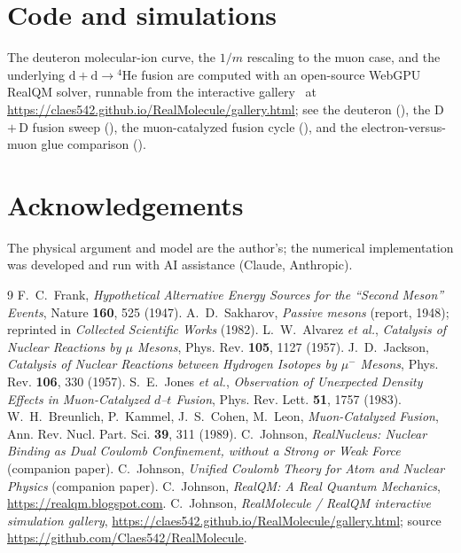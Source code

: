 \documentclass[11pt]{article}
\begin{document}
\section*{Code and simulations}
\sloppy
The deuteron molecular-ion curve, the $1/m$ rescaling to the muon case, and the underlying
$\mathrm{d}+\mathrm{d}\to{}^4\mathrm{He}$ fusion are computed with an open-source WebGPU RealQM solver,
runnable from the interactive gallery~\cite{Gallery} at
\url{https://claes542.github.io/RealMolecule/gallery.html}; see the deuteron (),
the D\,$+$\,D fusion sweep (), the muon-catalyzed fusion cycle
(), and the electron-versus-muon glue comparison
().
\fussy

\section*{Acknowledgements}
The physical argument and model are the author's; the numerical implementation was developed and run
with AI assistance (Claude, Anthropic).

\begin{thebibliography}{9}
 F.~C.~Frank, \emph{Hypothetical Alternative Energy Sources for the ``Second Meson''
Events}, Nature \textbf{160}, 525 (1947).
 A.~D.~Sakharov, \emph{Passive mesons} (report, 1948); reprinted in \emph{Collected
Scientific Works} (1982).
 L.~W.~Alvarez \emph{et al.}, \emph{Catalysis of Nuclear Reactions by $\mu$ Mesons},
Phys. Rev. \textbf{105}, 1127 (1957).
 J.~D.~Jackson, \emph{Catalysis of Nuclear Reactions between Hydrogen Isotopes by
$\mu^-$ Mesons}, Phys. Rev. \textbf{106}, 330 (1957).
 S.~E.~Jones \emph{et al.}, \emph{Observation of Unexpected Density Effects in
Muon-Catalyzed $d$--$t$ Fusion}, Phys. Rev. Lett. \textbf{51}, 1757 (1983).
 W.~H.~Breunlich, P.~Kammel, J.~S.~Cohen, M.~Leon, \emph{Muon-Catalyzed Fusion},
Ann. Rev. Nucl. Part. Sci. \textbf{39}, 311 (1989).
 C.~Johnson, \emph{RealNucleus: Nuclear Binding as Dual Coulomb
Confinement, without a Strong or Weak Force} (companion paper).
 C.~Johnson, \emph{Unified Coulomb Theory for Atom and Nuclear Physics}
(companion paper).
 C.~Johnson, \emph{RealQM: A Real Quantum Mechanics},
\url{https://realqm.blogspot.com}.
 C.~Johnson, \emph{RealMolecule / RealQM interactive simulation gallery},
\url{https://claes542.github.io/RealMolecule/gallery.html}; source
\url{https://github.com/Claes542/RealMolecule}.
\end{thebibliography}
\end{document}
